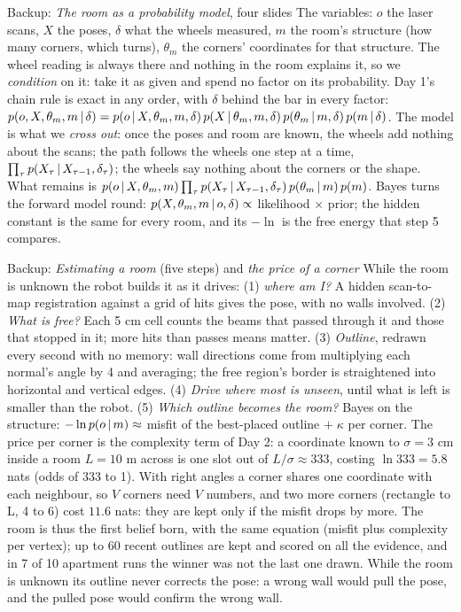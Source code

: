 \documentclass[11pt]{article}
\begin{document}
\begin{backupbox}{Backup: \emph{The room as a probability model}, four slides}
The variables: $o$ the laser scans, $X$ the poses, $\delta$ what the wheels measured, $m$ the room's structure (how many corners, which turns), $\theta_m$ the corners' coordinates for that structure. The wheel reading is always there and nothing in the room explains it, so we \emph{condition} on it: take it as given and spend no factor on its probability. Day 1's chain rule is exact in any order, with $\delta$ behind the bar in every factor: $p(o,X,\theta_m,m\,|\,\delta)=p(o\,|\, X,\theta_m,m,\delta)\,p(X\,|\,\theta_m,m,\delta)\,p(\theta_m\,|\, m,\delta)\,p(m\,|\,\delta)$. The model is what we \emph{cross out}: once the poses and room are known, the wheels add nothing about the scans; the path follows the wheels one step at a time, $\prod_\tau p(X_\tau\,|\, X_{\tau-1},\delta_\tau)$; the wheels say nothing about the corners or the shape. What remains is $p(o\,|\, X,\theta_m,m)\prod_\tau p(X_\tau\,|\, X_{\tau-1},\delta_\tau)\,p(\theta_m\,|\, m)\,p(m)$. Bayes turns the forward model round: $p(X,\theta_m,m\,|\, o,\delta)\propto$ likelihood $\times$ prior; the hidden constant is the same for every room, and its $-\ln$ is the free energy that step 5 compares.
\end{backupbox}

\begin{backupbox}{Backup: \emph{Estimating a room} (five steps) and \emph{the price of a corner}}
While the room is unknown the robot builds it as it drives: (1) \emph{where am I?} A hidden scan-to-map registration against a grid of hits gives the pose, with no walls involved. (2) \emph{What is free?} Each 5 cm cell counts the beams that passed through it and those that stopped in it; more hits than passes means matter. (3) \emph{Outline}, redrawn every second with no memory: wall directions come from multiplying each normal's angle by 4 and averaging; the free region's border is straightened into horizontal and vertical edges. (4) \emph{Drive where most is unseen}, until what is left is smaller than the robot. (5) \emph{Which outline becomes the room?} Bayes on the structure: $-\ln p(o\,|\, m)\approx$ misfit of the best-placed outline $+\;\kappa$ per corner. The price per corner is the complexity term of Day 2: a coordinate known to $\sigma=3$ cm inside a room $L=10$ m across is one slot out of $L/\sigma\approx333$, costing $\ln333=5.8$ nats (odds of 333 to 1). With right angles a corner shares one coordinate with each neighbour, so $V$ corners need $V$ numbers, and two more corners (rectangle to L, 4 to 6) cost $11.6$ nats: they are kept only if the misfit drops by more. The room is thus the first belief born, with the same equation (misfit plus complexity per vertex); up to 60 recent outlines are kept and scored on all the evidence, and in 7 of 10 apartment runs the winner was not the last one drawn. While the room is unknown its outline never corrects the pose: a wrong wall would pull the pose, and the pulled pose would confirm the wrong wall.
\end{backupbox}
\end{document}

